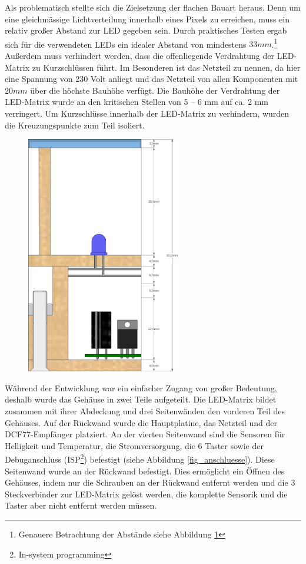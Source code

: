 Als problematisch stellte sich die Zielsetzung der flachen Bauart heraus. Denn um eine gleichmässige Lichtverteilung innerhalb eines Pixels zu erreichen, muss ein relativ großer Abstand zur LED gegeben sein. Durch praktisches Testen ergab sich für die verwendeten LEDs ein idealer Abstand von mindestens $33mm$.\footnote{Genauere Betrachtung der Abstände siehe Abbildung \ref{fig_querschnitt}}
Außerdem muss verhindert werden, dass die offenliegende Verdrahtung der LED-Matrix zu Kurzschlüssen führt. Im Besonderen ist das Netzteil zu nennen, da hier eine Spannung von 230 Volt anliegt und das Netzteil von allen Komponenten mit $20 mm$ über die höchste Bauhöhe verfügt. 
Die Bauhöhe der Verdrahtung der LED-Matrix wurde an den kritischen Stellen von 5 -- 6 mm auf ca. 2 mm verringert. Um Kurzschlüsse innerhalb der LED-Matrix zu verhindern, wurden die Kreuzungspunkte zum Teil isoliert.
\begin{figure}
\begin{center}
\includegraphics[width=0.6\textwidth]{skizzen/querschnitt.png}
\label{fig_querschnitt}
\end{center}
\end{figure}
Während der Entwicklung war ein einfacher Zugang von großer Bedeutung, deshalb wurde das Gehäuse in zwei Teile aufgeteilt. Die LED-Matrix bildet zusammen mit ihrer Abdeckung und drei Seitenwänden den vorderen Teil des Gehäuses. Auf der Rückwand wurde die Hauptplatine, das Netzteil und der DCF77-Empfänger platziert. An der vierten Seitenwand sind die Sensoren für Helligkeit und Temperatur, die Stromversorgung, die 6 Taster sowie der Debuganschluss (ISP\footnote{In-system programming}) befestigt (siehe Abbildung \ref{fig_anschluesse}). Diese Seitenwand wurde an der Rückwand befestigt. Dies ermöglicht ein Öffnen des Gehäuses, indem nur die Schrauben an der Rückwand entfernt werden und die 3 Steckverbinder zur LED-Matrix gelöst werden, die komplette Sensorik und die Taster aber nicht entfernt werden müssen.%
